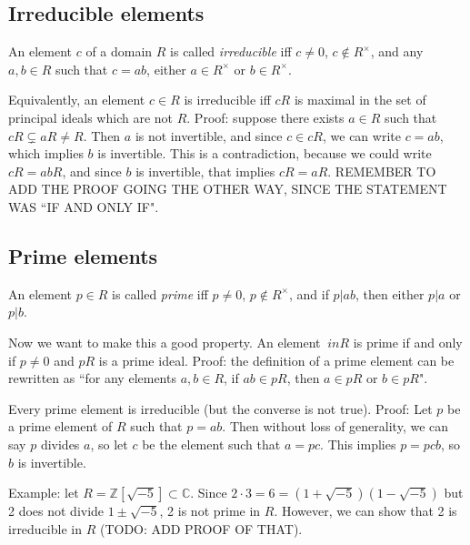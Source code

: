 \documentclass[12pt]{article}
\begin{document}
\subsection{Irreducible elements}
An element $c$ of a domain $R$ is called \textit{irreducible} iff $c \neq 0$, $c \not\in R^\times$, and any $a,b \in R$ such that $c=ab$, either $a \in R^\times$ or $b \in R^\times$.
\par
Equivalently, an element $c \in R$ is irreducible iff $cR$ is maximal in the set of principal ideals which are not $R$. Proof: suppose there exists $a \in R$ such that $cR \subsetneq aR \neq R$. Then $a$ is not invertible, and since $c \in cR$, we can write $c=ab$, which implies $b$ is invertible. This is a contradiction, because we could write $cR=abR$, and since $b$ is invertible, that implies $cR=aR$. REMEMBER TO ADD THE PROOF GOING THE OTHER WAY, SINCE THE STATEMENT WAS ``IF AND ONLY IF".
\subsection{Prime elements}
An element $p \in R$ is called \textit{prime} iff $p \neq 0$, $p \not\in R^\times$, and if $p|ab$, then either $p|a$ or $p|b$.
\par
Now we want to make this a good property. An element $\ in R$ is prime if and only if $p \neq 0$ and $pR$ is a prime ideal. Proof: the definition of a prime element can be rewritten as ``for any elements $a,b \in R$, if $ab\in pR$, then $a \in pR$ or $b \in pR$".
\par
Every prime element is irreducible (but the converse is not true). Proof: Let $p$ be a prime element of $R$ such that $p=ab$. Then without loss of generality, we can say $p$ divides $a$, so let $c$ be the element such that $a=pc$. This implies $p=pcb$, so $b$ is invertible.
\par
Example: let $R = \mathbb{Z}[\sqrt{-5}] \subset \mathbb{C}$. Since $2\cdot 3=6=(1+\sqrt{-5})(1-\sqrt{-5})$ but 2 does not divide $1 \pm \sqrt{-5}$, 2 is not prime in $R$. However, we can show that 2 is irreducible in $R$ (TODO: ADD PROOF OF THAT).
\end{document}

